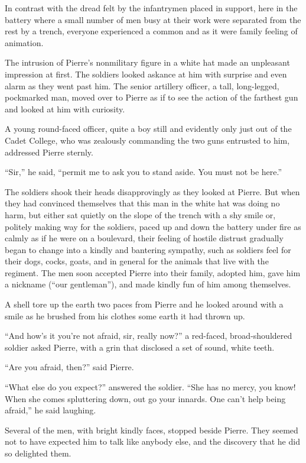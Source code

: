 In contrast with the dread felt by the infantrymen placed in
support, here in the battery where a small number of men busy at
their work were separated from the rest by a trench, everyone
experienced a common and as it were family feeling of animation.

The intrusion of Pierre's nonmilitary figure in a white hat made
an unpleasant impression at first. The soldiers looked askance at
him with surprise and even alarm as they went past him. The
senior artillery officer, a tall, long-legged, pockmarked man,
moved over to Pierre as if to see the action of the farthest gun
and looked at him with curiosity.

A young round-faced officer, quite a boy still and evidently only
just out of the Cadet College, who was zealously commanding the
two guns entrusted to him, addressed Pierre sternly.

``Sir,'' he said, ``permit me to ask you to stand aside. You must
not be here.''

The soldiers shook their heads disapprovingly as they looked at
Pierre.  But when they had convinced themselves that this man in
the white hat was doing no harm, but either sat quietly on the
slope of the trench with a shy smile or, politely making way for
the soldiers, paced up and down the battery under fire as calmly
as if he were on a boulevard, their feeling of hostile distrust
gradually began to change into a kindly and bantering sympathy,
such as soldiers feel for their dogs, cocks, goats, and in
general for the animals that live with the regiment. The men soon
accepted Pierre into their family, adopted him, gave him a
nickname (``our gentleman''), and made kindly fun of him among
themselves.

A shell tore up the earth two paces from Pierre and he looked
around with a smile as he brushed from his clothes some earth it
had thrown up.

``And how's it you're not afraid, sir, really now?'' a red-faced,
broad-shouldered soldier asked Pierre, with a grin that disclosed
a set of sound, white teeth.

``Are you afraid, then?'' said Pierre.

``What else do you expect?'' answered the soldier. ``She has no
mercy, you know! When she comes spluttering down, out go your
innards. One can't help being afraid,'' he said laughing.

Several of the men, with bright kindly faces, stopped beside
Pierre.  They seemed not to have expected him to talk like
anybody else, and the discovery that he did so delighted them.

